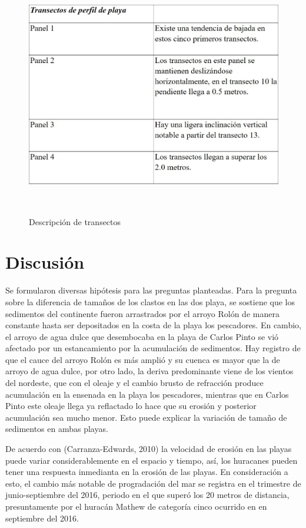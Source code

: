 \documentclass[11pt,]{article}
\begin{document}
\begin{figure}
\centering
\includegraphics[height=4.16667in]{Descripcion_paneles.jpg}
\caption{Descripción de transectos \label{transectos-playa}}
\end{figure}

\section{Discusión}\label{discusiuxf3n}

Se formularon diversas hipótesis para las preguntas planteadas. Para la
pregunta sobre la diferencia de tamaños de los clastos en las dos playa,
se sostiene que los sedimentos del continente fueron arrastrados por el
arroyo Rolón de manera constante hasta ser depositados en la costa de la
playa los pescadores. En cambio, el arroyo de agua dulce que desembocaba
en la playa de Carlos Pinto se vió afectado por un estancamiento por la
acumulación de sedimentos. Hay registro de que el cauce del arroyo Rolón
es más amplió y su cuenca es mayor que la de arroyo de agua dulce, por
otro lado, la deriva predominante viene de los vientos del nordeste, que
con el oleaje y el cambio brusto de refracción produce acumulación en la
ensenada en la playa los pescadores, mientras que en Carlos Pinto este
oleaje llega ya reflactado lo hace que su erosión y posterior
acumulación sea mucho menor. Esto puede explicar la variación de tamaño
de sedimentos en ambas playas.

De acuerdo con (Carranza-Edwards, 2010) la velocidad de erosión en las
playas puede variar considerablemente en el espacio y tiempo, así, los
huracanes pueden tener una respuesta inmedianta en la erosión de las
playas. En consideración a esto, el cambio más notable de progradación
del mar se registra en el trimestre de junio-septiembre del 2016,
periodo en el que superó los 20 metros de distancia, presuntamente por
el huracán Mathew de categoría cinco ocurrido en en septiembre del 2016.
\end{document}
